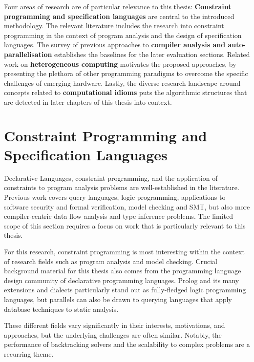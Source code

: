 
    Four areas of research are of particular relevance to this thesis:
    {\bf Constraint programming and specification languages} are central to the
    introduced methodology.
    The relevant literature includes the research into constraint programming in
    the context of program analysis and the design of specification languages.
    The survey of previous approaches to
    {\bf compiler analysis and auto-parallelisation}
    establishes the baselines for the later evaluation sections.
    Related work on {\bf heterogeneous computing} motivates the proposed
    approaches, by presenting the plethora of other programming paradigms to
    overcome the specific challenges of emerging hardware.
    Lastly, the diverse research landscape around concepts related to
    {\bf computational idioms} puts the algorithmic structures that are detected
    in later chapters of this thesis into context.

\section{Constraint Programming and Specification Languages}

    Declarative Languages, constraint programming, and the application of
    constraints to program analysis problems are well-established in the
    literature.
    Previous work covers query languages, logic programming, applications to
    software security and formal verification, model checking and SMT,
    but also more compiler-centric data flow analysis and type inference
    problems.
    The limited scope of this section requires a focus on work that is
    particularly relevant to this thesis.

    For this research, constraint programming is most interesting within the
    context of research fields such as program analysis and model checking.
    Crucial background material for this thesis also comes from
    the programming language design community of declarative programming
    languages.
    Prolog and its many extensions and dialects particularly stand out as
    fully-fledged logic programming languages, but parallels can also be drawn
    to querying languages that apply database techniques to static analysis.

    These different fields vary significantly in their interests, motivations,
    and approaches, but the underlying challenges are often similar.
    Notably, the performance of backtracking solvers and the scalability to
    complex problems are a recurring theme.

